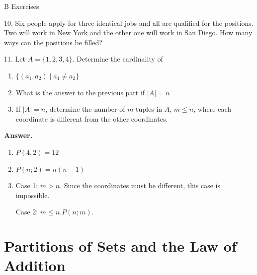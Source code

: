 \documentclass[10pt,]{book}
\theoremstyle{plain}
\theoremstyle{definition}
\theoremstyle{definition}
\theoremstyle{definition}
\begin{document}
\par\smallskip\noindent
\hypertarget{exercisegroup-4}{}\typeout{************************************************}
\typeout{************************************************}
B Exercises%
\begin{exercisegroup}
\item[10.]\hypertarget{exercise-30}{} Six people apply for three identical jobs and all are qualified for the positions. Two will work in New York and the other one will work in San Diego. How many ways can the positions be filled?%
\par\smallskip
\item[11.]\hypertarget{exercise-31}{} Let \(A = \{1, 2, 3, 4\} \). Determine the cardinality of%
\par
\leavevmode%
\begin{enumerate}[label=\alph*]
\item\hypertarget{li-33}{}\(\{ (a_1,a_2) \mid a_1 \neq a_2 \}\)%
\item\hypertarget{li-34}{}What is the answer to the previous part if \(\lvert A \rvert = n\)%
\item\hypertarget{li-35}{}If \(\lvert A \rvert =n\), determine the number of \(m\)-tuples in \(A\), \(m \leq n\), where each coordinate is different from the other coordinates.%
\end{enumerate}
%
\par\smallskip
\par\smallskip
\noindent\textbf{Answer.}\hypertarget{answer-16}{}\quad
\leavevmode%
\begin{enumerate}[label=\alph*]
\item\hypertarget{li-36}{}\(P(4,2)=12\)%
\item\hypertarget{li-37}{} \(P(n;2)=n(n-1)\)%
\item\hypertarget{li-38}{} Case 1: \(m>n\). Since the coordinates must be different, this case is impossible. %
\par
Case 2: \(m\leqslant n. P(n;m)\).%
\end{enumerate}
%
\end{exercisegroup}
\par\smallskip\noindent
\typeout{************************************************}
\typeout{************************************************}
\section[Partitions of Sets and the Law of Addition]{Partitions of Sets and the Law of Addition}\label{Partitions-and-Law-of-Addition}
\end{document}
